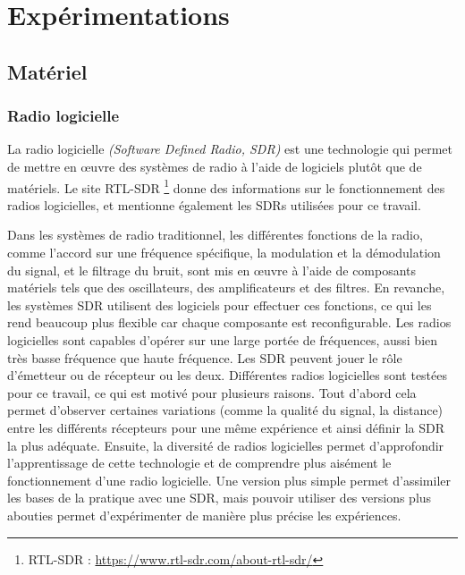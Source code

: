 \chapter{Expérimentations}


\renewcommand{\leftmark}{EXPERIMENTATIONS}

\section{Matériel}

\subsection{Radio logicielle}

La radio logicielle \textit{(Software Defined Radio, SDR)} est une technologie qui permet de mettre en œuvre des systèmes de radio à l'aide de logiciels plutôt que de matériels. Le site RTL-SDR \footnote{RTL-SDR : \href{https://www.rtl-sdr.com/about-rtl-sdr/}{https://www.rtl-sdr.com/about-rtl-sdr/}} donne des informations sur le fonctionnement des radios logicielles, et mentionne également les SDRs utilisées pour ce travail.

\vspace{0.1cm}

Dans les systèmes de radio traditionnel, les différentes fonctions de la radio, comme l'accord sur une fréquence spécifique, la modulation et la démodulation du signal, et le filtrage du bruit, sont mis en œuvre à l'aide de composants matériels tels que des oscillateurs, des amplificateurs et des filtres. En revanche, les systèmes SDR utilisent des logiciels pour effectuer ces fonctions, ce qui les rend beaucoup plus flexible car chaque composante est reconfigurable. Les radios logicielles sont capables d'opérer sur une large portée de fréquences, aussi bien très basse fréquence que haute fréquence.
Les SDR peuvent jouer le rôle d'émetteur ou de récepteur ou les deux. Différentes radios logicielles sont testées pour ce travail, ce qui est motivé pour plusieurs raisons. Tout d'abord cela permet d'observer certaines variations (comme la qualité du signal, la distance) entre les différents récepteurs pour une même expérience et ainsi définir la SDR la plus adéquate. Ensuite, la diversité de radios logicielles permet d'approfondir l'apprentissage de cette technologie et de comprendre plus aisément le fonctionnement d'une radio logicielle. Une version plus simple permet d'assimiler les bases de la pratique avec une SDR, mais pouvoir utiliser des versions plus abouties permet d'expérimenter de manière plus précise les expériences.

